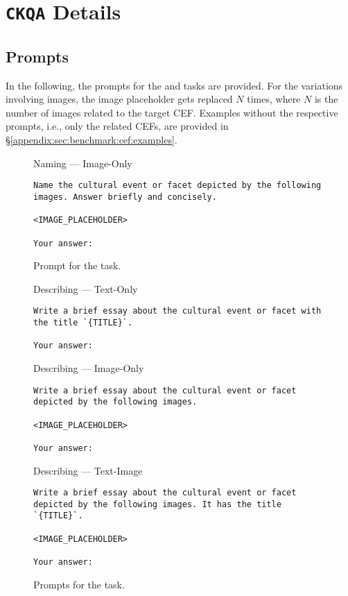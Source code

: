 \section{\texttt{CKQA} Details}
\label{appendix:sec:ckqa}
%

\subsection{Prompts}
\label{appendix:sec:ckqa:prompts}
%
In the following, the prompts for the \ckqan and \ckqad tasks are provided.
%
For the variations involving images, the image placeholder gets replaced $N$ times, where $N$ is the number of images related to the target CEF.
%
Examples without the respective prompts, i.e., only the related CEFs, are provided in \S\ref{appendix:sec:benchmark:cef:examples}.
%

\begin{figure*}[ht!]
    \centering
    \begin{promptbox}{Naming --- Image-Only}
    \begin{verbatim}
Name the cultural event or facet depicted by the following images. Answer briefly and concisely.

<IMAGE_PLACEHOLDER>

Your answer: 
    \end{verbatim}
    \end{promptbox}
    \label{fig:ckqa:prompts_n}
    \caption{Prompt for the \ckqan task.}
\end{figure*}
%

\begin{figure*}[ht!]
    \centering
    \begin{promptbox}{Describing --- Text-Only}
    \begin{verbatim}
Write a brief essay about the cultural event or facet with the title `{TITLE}`.

Your answer: 
    \end{verbatim}
    \end{promptbox}
    \begin{promptbox}{Describing --- Image-Only}
    \begin{verbatim}
Write a brief essay about the cultural event or facet depicted by the following images.

<IMAGE_PLACEHOLDER>

Your answer: 
    \end{verbatim}
    \end{promptbox}
    \begin{promptbox}{Describing --- Text-Image}
    \begin{verbatim}
Write a brief essay about the cultural event or facet depicted by the following images. It has the title `{TITLE}`.

<IMAGE_PLACEHOLDER>

Your answer: 
    \end{verbatim}
    \end{promptbox}
    \label{fig:ckqa:prompts_c}
    \caption{Prompts for the \ckqad task.}
\end{figure*}
%
